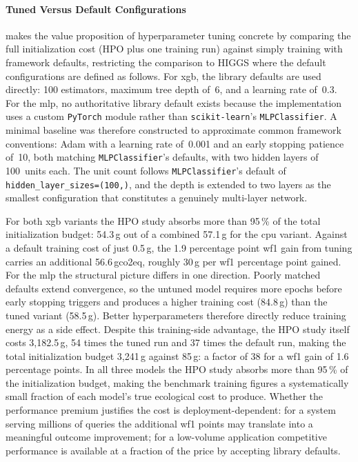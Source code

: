 \paragraph{Tuned Versus Default Configurations}
 makes the value proposition of hyperparameter tuning concrete by comparing the full initialization cost (HPO plus one training run) against simply training with framework defaults, restricting the comparison to HIGGS where the default configurations are defined as follows. For \gls{xgb}, the
library defaults are used directly: 100 estimators, maximum tree depth
of~6, and a learning rate of~0.3. For the \gls{mlp}, no authoritative
library default exists because the implementation uses a custom
\texttt{PyTorch} module rather than \texttt{scikit-learn}'s
\texttt{MLPClassifier}. A minimal baseline was therefore constructed to
approximate common framework conventions: Adam with a learning rate
of~0.001 and an early stopping patience of~10, both matching
\texttt{MLPClassifier}'s defaults, with two hidden layers of 100~units
each. The unit count follows \texttt{MLPClassifier}'s default of
\texttt{hidden\_layer\_sizes=(100,)}, and the depth is extended to two
layers as the smallest configuration that constitutes a genuinely
multi-layer network.

For both \gls{xgb} variants the HPO study absorbs more than 95\,\% of the total initialization budget: 54.3\,g out of a combined 57.1\,g for the \gls{cpu} variant. Against a default training cost of just 0.5\,g, the 1.9 percentage point \gls{wf1} gain from tuning carries an additional 56.6\,\gls{gco2eq}, roughly 30\,g per \gls{wf1} percentage point gained. For the \gls{mlp} the structural picture differs in one direction. Poorly matched defaults extend convergence, so the untuned model requires more epochs before early stopping triggers and produces a higher training cost (84.8\,g) than the tuned variant (58.5\,g). Better hyperparameters therefore directly reduce training energy as a side effect. Despite this training-side advantage, the HPO study itself costs 3{,}182.5\,g, 54 times the tuned run and 37 times the default run, making the total initialization budget 3{,}241\,g against 85\,g: a factor of 38 for a \gls{wf1} gain of 1.6 percentage points. In all three models the HPO study absorbs more than 95\,\% of the initialization budget, making the benchmark training figures a systematically small fraction of each model's true ecological cost to produce. Whether the performance premium justifies the cost is deployment-dependent: for a system serving millions of queries the additional \gls{wf1} points may translate into a meaningful outcome improvement; for a low-volume application competitive performance is available at a fraction of the price by accepting library defaults.

